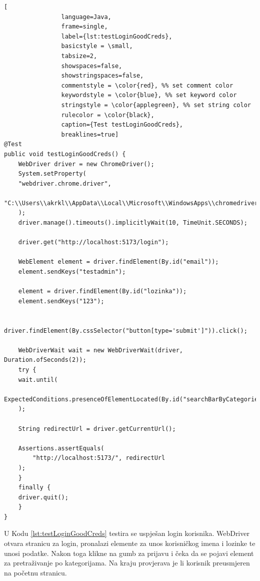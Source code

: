 			\renewcommand{\lstlistingname}{Kod}
			\begin{lstlisting}[
				language=Java,
				frame=single,
				label={lst:testLoginGoodCreds},
				basicstyle = \small,
				tabsize=2,
				showspaces=false,
				showstringspaces=false,
				commentstyle = \color{red}, %% set comment color
				keywordstyle = \color{blue}, %% set keyword color
				stringstyle = \color{applegreen}, %% set string color
				rulecolor = \color{black},
				caption={Test testLoginGoodCreds},
				breaklines=true]
@Test
public void testLoginGoodCreds() {
	WebDriver driver = new ChromeDriver();
	System.setProperty(
	"webdriver.chrome.driver", 
	"C:\\Users\\akrkl\\AppData\\Local\\Microsoft\\WindowsApps\\chromedriver.exe"
	);
	driver.manage().timeouts().implicitlyWait(10, TimeUnit.SECONDS);

	driver.get("http://localhost:5173/login");

	WebElement element = driver.findElement(By.id("email"));
	element.sendKeys("testadmin");

	element = driver.findElement(By.id("lozinka"));
	element.sendKeys("123");

	driver.findElement(By.cssSelector("button[type='submit']")).click();

	WebDriverWait wait = new WebDriverWait(driver, Duration.ofSeconds(2));
	try {
	wait.until(
		ExpectedConditions.presenceOfElementLocated(By.id("searchBarByCategories"))
	);

	String redirectUrl = driver.getCurrentUrl();

	Assertions.assertEquals(
		"http://localhost:5173/", redirectUrl
	);
	}
	finally {
	driver.quit();
	}
}	
			\end{lstlisting}
			
			U Kodu \ref{lst:testLoginGoodCreds} testira se uspješan login korisnika. WebDriver otvara stranicu za login, pronalazi elemente za unos korisničkog imena i lozinke te unosi podatke. Nakon toga klikne na gumb za prijavu i čeka da se pojavi element za pretraživanje po kategorijama. Na kraju provjerava je li korisnik preusmjeren na početnu stranicu. 
			
			\pagebreak
			
